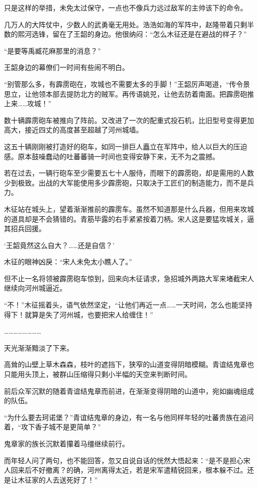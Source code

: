 只是这样的举措，未免太过保守，一点也不像兵力远过敌军的主帅该下的命令。

几万人的大阵仗中，少数人的武勇毫无用处。浩浩如海的军阵中，赵隆带着只剩半数的熙河选锋，留在了王韶的身边。他很纳闷：“怎么木征还是在避战的样子？”

“是要等禹臧花麻那里的消息？”

王韶身边的幕僚们一时间有些闹不明白。

“别管那么多，有霹雳砲在，攻城也不需要太多的手脚！”王韶厉声喝道，“传令景思立，让他领本部去提防北方的贼军。再传语姚兕，让他去防着南面。把霹雳砲推上来……攻城！”

数十辆霹雳砲车被推向了阵前。又改进了一次的配重式投石机，比旧型号变得更加高大，接近四丈的高度甚至超越了河州城墙。

这五十辆刚刚被打造好的砲车，如同一排巨人矗立在军阵中，给人以巨大的压迫感。原本鼓噪蠢动的吐蕃蕃骑一时间也变得安静下来，无不为之震撼。

若在过去，一辆行砲车至少需要五七十人服侍，而眼下的霹雳砲，却是需用的人数少到极致。出战的大军能使用多少霹雳砲，只取决于工匠们的制造能力，而不是兵力。

木征站在城头上，望着渐渐推前的霹雳车。虽然不知道那是什么兵器，但用来攻城的道具却是不会猜错的。青筋毕露的右手紧紧按着刀柄。宋人这是要猛攻城关，逼其招兵回援。

‘王韶竟然这么自大？……还是自信？’

木征的眼神凶戾：“宋人未免太小瞧人了。”

但不止一名将领被霹雳砲车惊到，回来向木征请求，急招城外两路大军来堵截宋人继续向河州城逼近。

“不！”木征摇着头，语气依然坚定，“让他们再近一点……一天时间，怎么也能坚持得下！就算是失了河州城，也要把宋人给缠住！”

……………………

天光渐渐黯淡了下来。

高耸的山壁上草木森森，枝叶的遮挡下，狭窄的山道变得阴暗模糊。青谊结鬼章也只能用头顶上，被群山压缩得只剩小半幅的天空来判断时间。

前后众军沉默的随着青谊结鬼章而前进，在渐渐变得阴暗的山道中，宛如幽魂组成的队伍。

“为什么要去珂诺堡？”青谊结鬼章的身边，有一名与他同样年轻的吐蕃贵族在追问着，“攻下香子城不是更简单？”

鬼章家的族长沉默着攥着马缰继续前行。

而年轻人问了两句，也不能回答，忽又自说自话的恍然大悟起来：“是不是担心宋人回来后不好撤离？的确，河州离得太近，若是宋军遣精锐回来，根本躲不过。还是让木征家的人去送死好了！”

